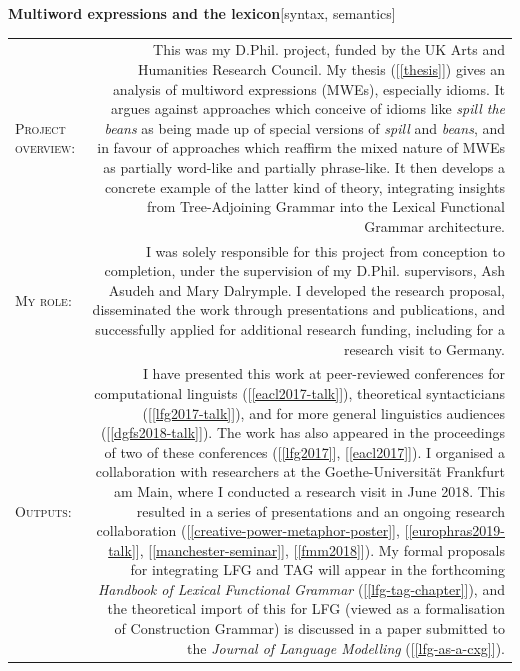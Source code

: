 \documentclass[11pt,a4paper]{article}
\makeatletter
\newlength{\rulelength}%
\newcommand{\REx}[2]{%
\vspace*{0.1\baselineskip}%
{\large\textbf{#1}\hfill\textnormal{[#2]}}%
\vspace*{0.5\baselineskip}%
}
\newenvironment{cvsection}{%
  \setlength{\extrarowheight}{0.70ex}
  \begin{longtable}[l]{@{} L R @{}}
}{%
  \end{longtable}
}
\newcommand{\sref}[1]{[\ref{#1}]}
\newcommand{\researchsubhead}[1]{%
\textsc{#1}:%
}
\newcommand{\cvheading}[1]{\noindent{{\color{headercolor}\rule[0.4ex]{\rulelength}{2pt}\hspace*{9pt} \Large #1}}\vspace*{0.5\baselineskip}}
\makeatother
\begin{document}
\REx{Multiword expressions and the lexicon}{syntax, semantics}
\begin{cvsection}
  \researchsubhead{Project overview} &%
  This was my D.Phil. project, funded by the UK Arts and Humanities Research
  Council. My thesis (\sref{thesis}) gives an analysis of multiword expressions
  (MWEs), especially idioms. It argues against approaches which conceive of
  idioms like \emph{spill the beans} as being made up of special versions of
  \emph{spill} and \emph{beans}, and in favour of approaches which reaffirm the
  mixed nature of MWEs as partially word-like and partially phrase-like. It then
  develops a concrete example of the latter kind of theory, integrating insights
  from Tree-Adjoining Grammar into the Lexical Functional Grammar architecture.%
  \\
  \researchsubhead{My role} &%
  I was solely responsible for this project from conception to completion, under
  the supervision of my D.Phil. supervisors, Ash Asudeh and Mary Dalrymple. I
  developed the research proposal, disseminated the work through presentations
  and publications, and successfully applied for additional research funding,
  including for a research visit to Germany.
  \\
  \researchsubhead{Outputs} &%
  I have presented this work at peer-reviewed conferences for computational
  linguists (\sref{eacl2017-talk}), theoretical syntacticians
  (\sref{lfg2017-talk}), and for more general linguistics audiences
  (\sref{dgfs2018-talk}). The work has also appeared in the proceedings of two
  of these conferences (\sref{lfg2017}, \sref{eacl2017}). I organised a
  collaboration with researchers at the Goethe-Universit\"{a}t Frankfurt am
  Main, where I conducted a research visit in June 2018. This resulted in a
  series of presentations and an ongoing research collaboration
  (\sref{creative-power-metaphor-poster}, \sref{europhras2019-talk},
  \sref{manchester-seminar}, \sref{fmm2018}). My formal proposals for
  integrating LFG and TAG will appear in the forthcoming \textit{Handbook of
    Lexical Functional Grammar} (\sref{lfg-tag-chapter}), and the theoretical
  import of this for LFG (viewed as a formalisation of Construction Grammar) is
  discussed in a paper submitted to the \textit{Journal of Language Modelling}
  (\sref{lfg-as-a-cxg}).
\end{cvsection}

\newpage

\cvheading{Teaching}
\end{document}
